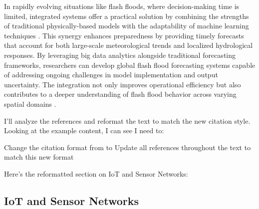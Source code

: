 In rapidly evolving situations like flash floods, where decision-making time is limited, integrated systems offer a practical solution by combining the strengths of traditional physically-based models with the adaptability of machine learning techniques \citep{Borga2019}. This synergy enhances preparedness by providing timely forecasts that account for both large-scale meteorological trends and localized hydrological responses.
By leveraging big data analytics alongside traditional forecasting frameworks, researchers can develop global flash flood forecasting systems capable of addressing ongoing challenges in model implementation and output uncertainty. The integration not only improves operational efficiency but also contributes to a deeper understanding of flash flood behavior across varying spatial domains \citep{Yang2022}\citep{Borga2019}.

I'll analyze the references and reformat the text to match the new citation style. Looking at the example content, I can see I need to:

Change the citation format from \parencite{numeric-code} to \citep{Author+Year}
Update all references throughout the text to match this new format

Here's the reformatted section on IoT and Sensor Networks:
\subsection{IoT and Sensor Networks}
